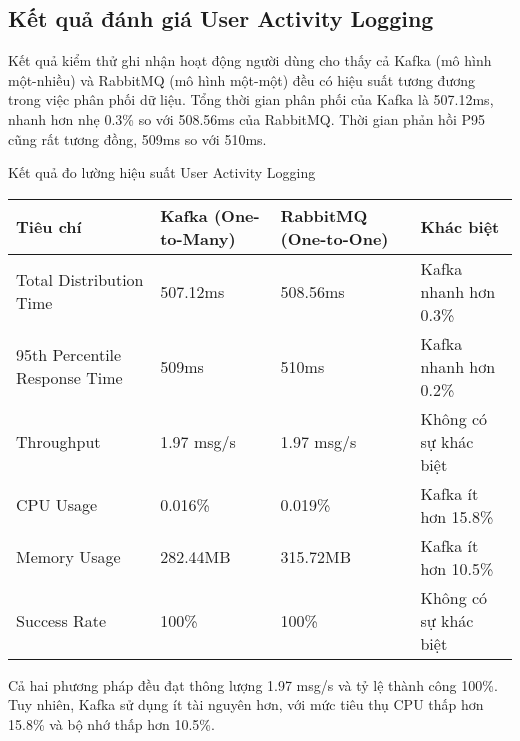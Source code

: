 \subsection{Kết quả đánh giá User Activity Logging}
Kết quả kiểm thử ghi nhận hoạt động người dùng cho thấy cả Kafka (mô hình một-nhiều) và RabbitMQ (mô hình một-một) đều có hiệu suất tương đương trong việc phân phối dữ liệu. Tổng thời gian phân phối của Kafka là 507.12ms, nhanh hơn nhẹ 0.3\% so với 508.56ms của RabbitMQ. Thời gian phản hồi P95 cũng rất tương đồng, 509ms so với 510ms.

\begin{table}[h]{Kết quả đo lường hiệu suất User Activity Logging}
    \centering
    {\setlength{\arrayrulewidth}{1pt}
        \renewcommand{\arraystretch}{1.5}
        \setlength{\tabcolsep}{6pt}
        \begin{tabular}{|p{3.2cm}|p{3.2cm}|p{3.2cm}|p{3.2cm}|}
            \hline
            \textbf{Tiêu chí}             & \textbf{Kafka (One-to-Many)} & \textbf{RabbitMQ (One-to-One)} & \textbf{Khác biệt}    \\
            \hline
            Total Distribution Time       & 507.12ms                     & 508.56ms                       & Kafka nhanh hơn 0.3\% \\
            \hline
            95th Percentile Response Time & 509ms                        & 510ms                          & Kafka nhanh hơn 0.2\% \\
            \hline
            Throughput                    & 1.97 msg/s                   & 1.97 msg/s                     & Không có sự khác biệt \\
            \hline
            CPU Usage                     & 0.016\%                      & 0.019\%                        & Kafka ít hơn 15.8\%   \\
            \hline
            Memory Usage                  & 282.44MB                     & 315.72MB                       & Kafka ít hơn 10.5\%   \\
            \hline
            Success Rate                  & 100\%                        & 100\%                          & Không có sự khác biệt \\
            \hline
        \end{tabular}}
\end{table}

Cả hai phương pháp đều đạt thông lượng 1.97 msg/s và tỷ lệ thành công 100\%. Tuy nhiên, Kafka sử dụng ít tài nguyên hơn, với mức tiêu thụ CPU thấp hơn 15.8\% và bộ nhớ thấp hơn 10.5\%.


